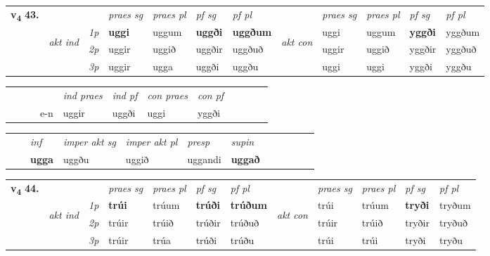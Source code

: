 \begin{tabular}{llllllllllll} \toprule
\multirow{4}{*}{{{\textbf{v{\textsubscript{4}}} \Large{\textbf{43.}}}}}  & &   &  \textit{praes sg}  & \textit{praes pl}  &\textit{ pf sg} & \textit{pf pl} &  &  \textit{praes sg}  & \textit{praes pl}  & \textit{pf sg} & \textit{pf pl } \\*
	\cmidrule{4-7} \cmidrule{9-12}
 & \multirow{3}{*}{\begin{turn}{90}\textit{akt ind}\end{turn}} & {\textit{1p}} & \textbf{uggi} & uggum    & \textbf{uggði} & \textbf{uggðum} & \multirow{3}{*}{\begin{turn}{90}\textit{akt con}\end{turn}} &uggi & uggum & \textbf{yggði} & yggðum\\*
& &  {\textit{2p}} &  uggir  & uggið   & uggðir & uggðuð & & uggir & uggið & yggðir & yggðuð \\*
& &  {\textit{3p}} & uggir & ugga   & uggði & uggðu & & uggi & uggi& yggði & yggðu  \\*
\cmidrule{4-7} \cmidrule{9-12}
\end{tabular}


\begin{tabular}{llllllllllll}
 & &  & &  \textit{ind praes} & \textit{ind pf} & \textit{con praes} & \textit{con pf} \\*
&  & & e-n & uggir & uggði & uggi & yggði \\*
\cmidrule{5-9}
\end{tabular}


\begin{tabular}{llllllllllll}
 & & \textit{inf} & \textit{imper akt sg} & \textit{imper akt pl}   & \textit{presp} & \textit{supin}       \\*
  & & \textbf{ugga} & uggðu  & uggið   & uggandi &  \textbf{uggað}   \\*
\cmidrule{1-12}
\end{tabular}



\begin{tabular}{llllllllllll} \toprule
\multirow{4}{*}{{{\textbf{v{\textsubscript{4}}} \Large{\textbf{44.}}}}}  & &   &  \textit{praes sg}  & \textit{praes pl}  &\textit{ pf sg} & \textit{pf pl} &  &  \textit{praes sg}  & \textit{praes pl}  & \textit{pf sg} & \textit{pf pl } \\*
	\cmidrule{4-7} \cmidrule{9-12}
 & \multirow{3}{*}{\begin{turn}{90}\textit{akt ind}\end{turn}} & {\textit{1p}} & \textbf{trúi} & trúum    & \textbf{trúði} & \textbf{trúðum} & \multirow{3}{*}{\begin{turn}{90}\textit{akt con}\end{turn}} &trúi & trúum & \textbf{tryði} & tryðum\\*
& &  {\textit{2p}} &  trúir  & trúið   & trúðir & trúðuð & & trúir & trúið & tryðir & tryðuð \\*
& &  {\textit{3p}} & trúir & trúa   & trúði & trúðu & & trúi & trúi& tryði & tryðu  \\*
\cmidrule{4-7} \cmidrule{9-12}
\end{tabular}


